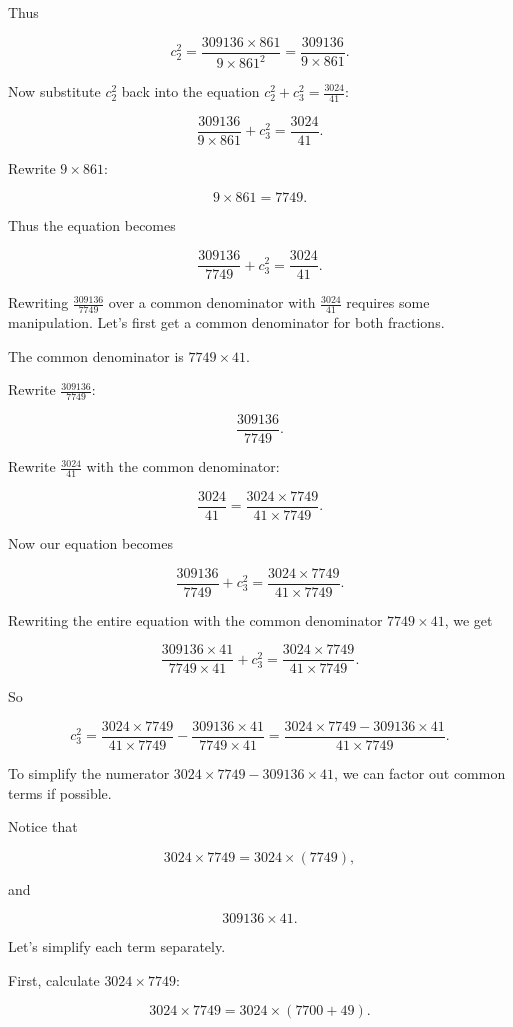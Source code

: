 Thus 

\[ c_2^2 = \frac{309136 \times 861}{9 \times 861^2} = \frac{309136}{9 \times 861}. \]

Now substitute $c_2^2$ back into the equation $c_2^2 + c_3^2 = \frac{3024}{41}$:

\[ \frac{309136}{9 \times 861} + c_3^2 = \frac{3024}{41}. \]

Rewrite $9 \times 861$:

\[ 9 \times 861 = 7749. \]

Thus the equation becomes

\[ \frac{309136}{7749} + c_3^2 = \frac{3024}{41}. \]

Rewriting $\frac{309136}{7749}$ over a common denominator with $\frac{3024}{41}$ requires some manipulation. Let's first get a common denominator for both fractions.

The common denominator is $7749 \times 41$.

Rewrite $\frac{309136}{7749}$:

\[ \frac{309136}{7749}. \]

Rewrite $\frac{3024}{41}$ with the common denominator:

\[ \frac{3024}{41} = \frac{3024 \times 7749}{41 \times 7749}. \]

Now our equation becomes

\[ \frac{309136}{7749} + c_3^2 = \frac{3024 \times 7749}{41 \times 7749}. \]

Rewriting the entire equation with the common denominator $7749 \times 41$, we get

\[ \frac{309136 \times 41}{7749 \times 41} + c_3^2 = \frac{3024 \times 7749}{41 \times 7749}. \]

So 

\[ c_3^2 = \frac{3024 \times 7749}{41 \times 7749} - \frac{309136 \times 41}{7749 \times 41} = \frac{3024 \times 7749 - 309136 \times 41}{41 \times 7749}. \]

To simplify the numerator $3024 \times 7749 - 309136 \times 41$, we can factor out common terms if possible.

Notice that 

\[ 3024 \times 7749 = 3024 \times (7749), \]

and

\[ 309136 \times 41. \]

Let's simplify each term separately.

First, calculate $3024 \times 7749$:

\[ 3024 \times 7749 = 3024 \times (7700 + 49). \]

